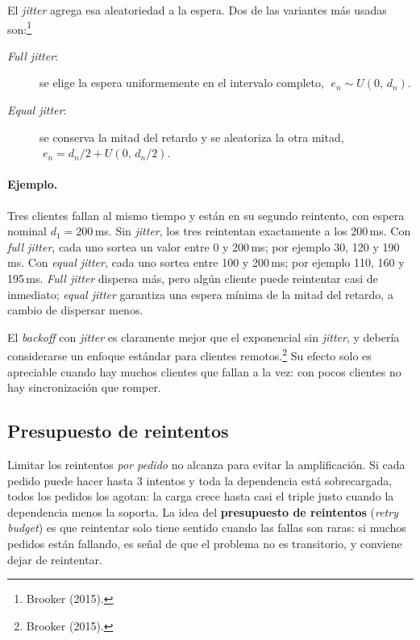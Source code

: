 \documentclass[variant=apuntes,cover=institutional,mode=screen]{ua-engineering-v6-article}
\begin{document}
El \emph{jitter} agrega esa aleatoriedad a la espera. Dos de las variantes más usadas son:\footnote{Brooker (2015).}
\begin{description}
\item[\emph{Full jitter}:] se elige la espera uniformemente en el intervalo completo, $\;e_n \sim U(0,\, d_n)$.
\item[\emph{Equal jitter}:] se conserva la mitad del retardo y se aleatoriza la otra mitad, $\;e_n = d_n/2 + U(0,\, d_n/2)$.
\end{description}

\paragraph{Ejemplo.} Tres clientes fallan al mismo tiempo y están en su segundo reintento, con espera nominal $d_1 = 200$\,ms. Sin \emph{jitter}, los tres reintentan exactamente a los 200\,ms. Con \emph{full jitter}, cada uno sortea un valor entre 0 y 200\,ms; por ejemplo 30, 120 y 190\,ms. Con \emph{equal jitter}, cada uno sortea entre 100 y 200\,ms; por ejemplo 110, 160 y 195\,ms. \emph{Full jitter} dispersa más, pero algún cliente puede reintentar casi de inmediato; \emph{equal jitter} garantiza una espera mínima de la mitad del retardo, a cambio de dispersar menos.

El \emph{backoff} con \emph{jitter} es claramente mejor que el exponencial sin \emph{jitter}, y debería considerarse un enfoque estándar para clientes remotos.\footnote{Brooker (2015).} Su efecto solo es apreciable cuando hay muchos clientes que fallan a la vez: con pocos clientes no hay sincronización que romper.

\subsection{Presupuesto de reintentos}

Limitar los reintentos \emph{por pedido} no alcanza para evitar la amplificación. Si cada pedido puede hacer hasta 3 intentos y toda la dependencia está sobrecargada, todos los pedidos los agotan: la carga crece hasta casi el triple justo cuando la dependencia menos la soporta. La idea del \textbf{presupuesto de reintentos} (\emph{retry budget}) es que reintentar solo tiene sentido cuando las fallas son raras: si muchos pedidos están fallando, es señal de que el problema no es transitorio, y conviene dejar de reintentar.
\end{document}
